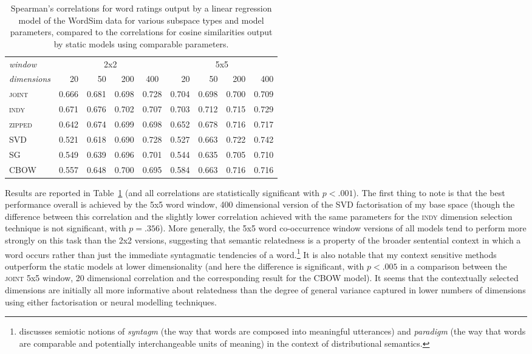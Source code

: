 \begin{table}
\centering
\begin{tabular}{lrrrr|rrrr}
\hline
\emph{window} & \multicolumn{4}{c}{2x2} & \multicolumn{4}{c}{5x5} \\
\emph{dimensions} & 20 & 50 & 200 & \multicolumn{1}{c}{400} & 20 & 50 & 200 & 400 \\
\hline
\textsc{joint} & 0.666 & 0.681 & 0.698 & 0.728 & 0.704 & 0.698 & 0.700 & 0.709 \\
\textsc{indy} & 0.671 & 0.676 & 0.702 & 0.707 & 0.703 & 0.712 & 0.715 & 0.729 \\
\textsc{zipped} & 0.642 & 0.674 & 0.699 & 0.698 & 0.652 & 0.678 & 0.716 & 0.717 \\
\textsc{SVD} & 0.521 & 0.618 & 0.690 & 0.728 & 0.527 & 0.663 & 0.722 & 0.742 \\
\textsc{SG} & 0.549 & 0.639 & 0.696 & 0.701 & 0.544 & 0.635 & 0.705 & 0.710 \\
\textsc{CBOW} & 0.557 & 0.648 & 0.700 & 0.695 & 0.584 & 0.663 & 0.716 & 0.716 \\
\hline
\end{tabular}
\caption{Spearman's correlations for word ratings output by a linear regression model of the WordSim data for various subspace types and model parameters, compared to the correlations for cosine similarities output by static models using comparable parameters.}
\label{tab:related}
\end{table}

Results are reported in Table~\ref{tab:related} (and all correlations are statistically significant with $p < .001$).  The first thing to note is that the best performance overall is achieved by the 5x5 word window, 400 dimensional version of the SVD factorisation of my base space (though the difference between this correlation and the slightly lower correlation achieved with the same parameters for the \textsc{indy} dimension selection technique is not significant, with $p = .356$).  More generally, the 5x5 word co-occurrence window versions of all models tend to perform more strongly on this task than the 2x2 versions, suggesting that semantic relatedness is a property of the broader sentential context in which a word occurs rather than just the immediate syntagmatic tendencies of a word.\footnote{\cite{Sahlgren} discusses  semiotic notions of \emph{syntagm} (the way that words are composed into meaningful utterances) and \emph{paradigm} (the way that words are comparable and potentially interchangeable units of meaning) in the context of distributional semantics.}  It is also notable that my context sensitive methods outperform the static models at lower dimensionality (and here the difference is significant, with $p < .005$ in a comparison between the \textsc{joint} 5x5 window, 20 dimensional correlation and the corresponding result for the \textsc{CBOW} model).  It seems that the contextually selected dimensions are initially all more informative about relatedness than the degree of general variance captured in lower numbers of dimensions using either factorisation or neural modelling techniques.

